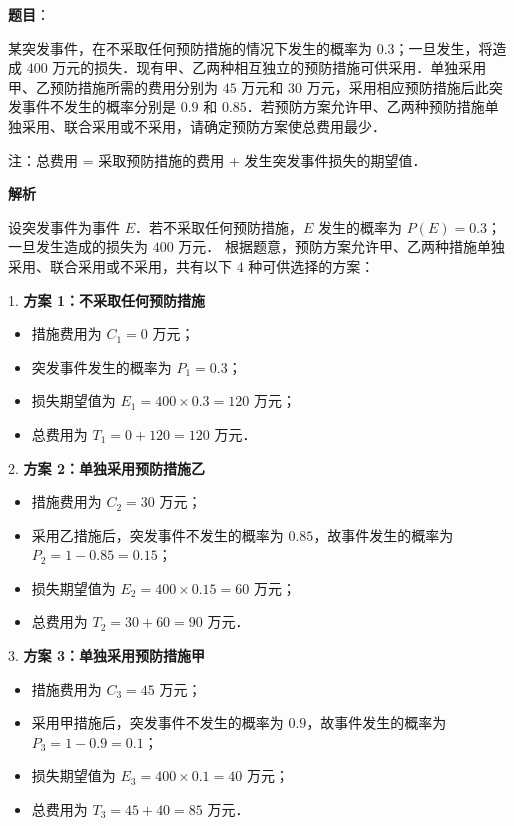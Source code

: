 \begin{answer}

\textbf{题目}：

某突发事件，在不采取任何预防措施的情况下发生的概率为 $0.3$；一旦发生，将造成 $400$ 万元的损失．现有甲、乙两种相互独立的预防措施可供采用．单独采用甲、乙预防措施所需的费用分别为 $45$ 万元和 $30$ 万元，采用相应预防措施后此突发事件不发生的概率分别是 $0.9$ 和 $0.85$．若预防方案允许甲、乙两种预防措施单独采用、联合采用或不采用，请确定预防方案使总费用最少．

注：总费用 = 采取预防措施的费用 + 发生突发事件损失的期望值．

\textbf{解析}

设突发事件为事件 $E$．若不采取任何预防措施，$E$ 发生的概率为 $P(E) = 0.3$；一旦发生造成的损失为 $400$ 万元．
根据题意，预防方案允许甲、乙两种措施单独采用、联合采用或不采用，共有以下 $4$ 种可供选择的方案：

1. \textbf{方案 1：不采取任何预防措施}
\begin{itemize}
\item 措施费用为 $C_1 = 0$ 万元；
\item 突发事件发生的概率为 $P_1 = 0.3$；
\item 损失期望值为 $E_1 = 400 \times 0.3 = 120$ 万元；
\item 总费用为 $T_1 = 0 + 120 = 120$ 万元．
\end{itemize}

2. \textbf{方案 2：单独采用预防措施乙}
\begin{itemize}
\item 措施费用为 $C_2 = 30$ 万元；
\item 采用乙措施后，突发事件不发生的概率为 $0.85$，故事件发生的概率为 $P_2 = 1 - 0.85 = 0.15$；
\item 损失期望值为 $E_2 = 400 \times 0.15 = 60$ 万元；
\item 总费用为 $T_2 = 30 + 60 = 90$ 万元．
\end{itemize}

3. \textbf{方案 3：单独采用预防措施甲}
\begin{itemize}
\item 措施费用为 $C_3 = 45$ 万元；
\item 采用甲措施后，突发事件不发生的概率为 $0.9$，故事件发生的概率为 $P_3 = 1 - 0.9 = 0.1$；
\item 损失期望值为 $E_3 = 400 \times 0.1 = 40$ 万元；
\item 总费用为 $T_3 = 45 + 40 = 85$ 万元．
\end{itemize}


\end{answer}
